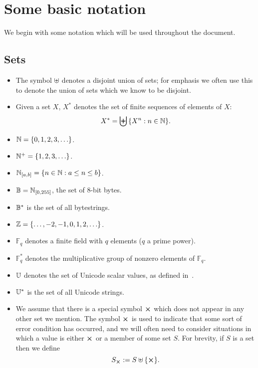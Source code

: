 \section{Some basic notation}
We begin with some notation which will be used throughout the document.

\subsection{Sets}
\label{sec:notation-sets}
\begin{itemize}
  \item The symbol $\uplus$ denotes a disjoint union of sets;  for emphasis we often use this
    to denote the union of sets which we know to be disjoint.
  \item Given a set $X$, $X^*$ denotes the set of finite sequences of elements of $X$:
    $$
    X^*= \biguplus{\{X^n: n \in \mathbb{N}\}}.
    $$
  \item $\mathbb{N} = \{0,1,2,3,\ldots\}$.
  \item $\mathbb{N}^{+} = \{1,2,3,\ldots\}$.
  \item $\mathbb{N}_{[a,b]} = \{n \in \mathbb{N}: a \leq n \leq b\}$.
  \item $\mathbb{B} = \mathbb{N}_{[0,255]}$, the set of 8-bit bytes.
  \item $\mathbb{B}^*$ is the set of all bytestrings.
  \item $\mathbb{Z} = \{\ldots, -2, -1, 0, 1, 2, \ldots\}$.
  \item $\mathbb{F}_q$ denotes a finite field with $q$ elements ($q$ a prime power).
  \item $\mathbb{F}_q^*$ denotes the multiplicative group of nonzero elements of $\mathbb{F}_q$.
  \item $\mathbb{U}$ denotes the set of Unicode scalar values, as defined in~\cite[Definition D76]{Unicode-standard}.
  \item $\mathbb{U}^*$ is the set of all Unicode strings.
  \item We assume that there is a special symbol $\errorX$ which does not appear
    in any other set we mention.  The symbol $\errorX$ is used to indicate that
    some sort of error condition has occurred, and we will often need to consider
    situations in which a value is either $\errorX$ or a member of some set $S$.
    For brevity, if $S$ is a set then we define
    $$
    \withError{S} := S \disj \{\errorX\}.
    $$
\end{itemize}%
%
%
%
%
%
%
%
%
%
%
%
%

